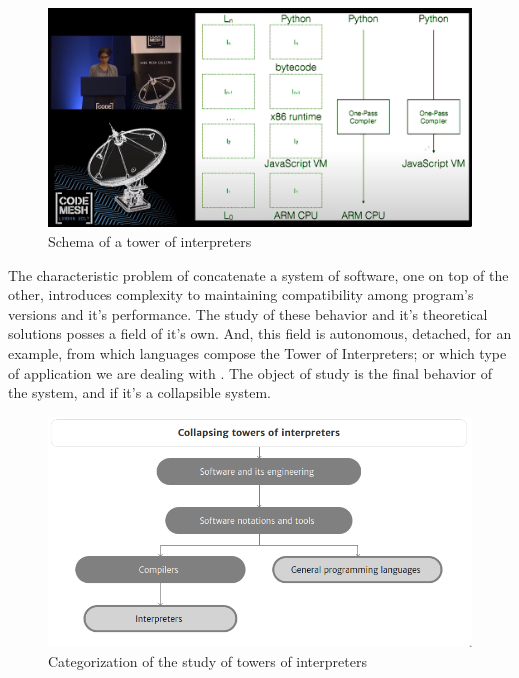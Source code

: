 \documentclass[
12pt,				%
openright,			%
oneside,			%
a4paper,			%
brazil,				%
english,			%
]{abntex2}
\begin{document}
\begin{figure}[ht]
  \centering
  \caption{\label{fig:tower} Schema of a tower of interpreters}
  \includegraphics[width=\linewidth]{torres.png}
\end{figure}

The characteristic problem of concatenate a system of software, one on
top of the other, introduces complexity to maintaining compatibility
among program's versions and it's performance. The study of these
behavior and it's theoretical solutions posses a field of it's
own. And, this field is autonomous, detached, for an example, from
which languages compose the Tower of Interpreters; or which type of
application we are dealing with \cite{amin2017towers}. The object of
study is the final behavior of the system, and if it's a collapsible system. 

\begin{figure}[ht]
  \centering
 \caption{\label{fig:tower2} Categorization of the study of towers of interpreters}
  \includegraphics[width=0.5\linewidth]{torres2.png}
\end{figure}
\end{document}
